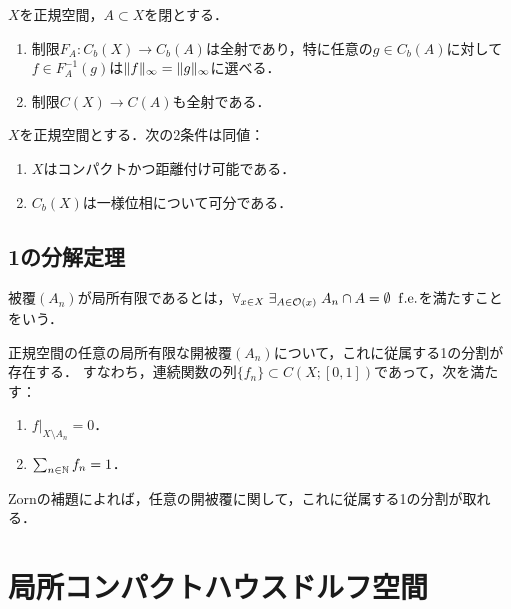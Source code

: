 \documentclass[uplatex,dvipdfmx]{jsreport}
\begin{document}
\begin{theorem}[Tietzeの延長定理 (AC)]
    $X$を正規空間，$A\subset X$を閉とする．
    \begin{enumerate}
        \item 制限$F_A:C_b(X)\to C_b(A)$は全射であり，特に任意の$g\in C_b(A)$に対して$f\in F_A^{-1}(g)$は$\|f\|_\infty=\|g\|_\infty$に選べる．
        \item 制限$C(X)\to C(A)$も全射である．
    \end{enumerate}
\end{theorem}

\begin{corollary}[有界連続関数の空間が可分になる条件 (AC)]
    $X$を正規空間とする．次の2条件は同値：
    \begin{enumerate}
        \item $X$はコンパクトかつ距離付け可能である．
        \item $C_b(X)$は一様位相について可分である．
    \end{enumerate}
\end{corollary}

\subsection{1の分解定理}

\begin{definition}
    被覆$(A_n)$が局所有限であるとは，$\forall_{x\in X}\;\exists_{A\in\mathcal{O}(x)}\;A_n\cap A=\emptyset\;\;\mathrm{f.e.}$を満たすことをいう．
\end{definition}

\begin{theorem}
    正規空間の任意の局所有限な開被覆$(A_n)$について，これに従属する1の分割が存在する．
    すなわち，連続関数の列$\{f_n\}\subset C(X;[0,1])$であって，次を満たす：
    \begin{enumerate}
        \item $f|_{X\setminus A_n}=0$．
        \item $\sum_{n\in\mathbb{N}}f_n=1$．
    \end{enumerate}
\end{theorem}
\begin{remark}
    Zornの補題によれば，任意の開被覆に関して，これに従属する1の分割が取れる．
\end{remark}

\section{局所コンパクトハウスドルフ空間}
\end{document}

